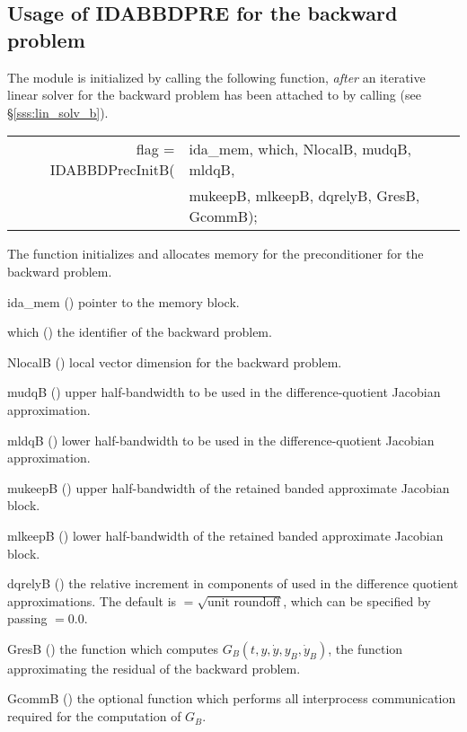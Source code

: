 \subsection{Usage of IDABBDPRE for the backward problem}
The {\idabbdpre} module is initialized by calling the following function,
{\em after} an iterative linear solver for the backward problem has
been attached to {\idas} by calling  (see
\S\ref{sss:lin_solv_b}).
{
  \begin{tabular}[t]{@{}r@{}l@{}}
    flag = IDABBDPrecInitB(&ida\_mem, which, NlocalB, mudqB, mldqB,\\
                           &mukeepB, mlkeepB, dqrelyB, GresB, GcommB);
  \end{tabular}
}
{
  The function  initializes and allocates
  memory for the {\idabbdpre} preconditioner for the backward problem.
}
{
  \begin{args}
  \item[ida\_mem] ()
    pointer to the {\idas} memory block.
  \item[which] ()
    the identifier of the backward problem.
  \item[NlocalB] ()
    local vector dimension for the backward problem.
  \item[mudqB] ()
    upper half-bandwidth to be used in the difference-quotient Jacobian approximation.
  \item[mldqB] ()
    lower half-bandwidth to be used in the difference-quotient Jacobian approximation.
  \item[mukeepB] ()
    upper half-bandwidth of the retained banded approximate Jacobian block.
  \item[mlkeepB] ()
    lower half-bandwidth of the retained banded approximate Jacobian block.
  \item[dqrelyB] ()
    the relative increment in components of  used in the difference quotient
    approximations.  The default is $ = \sqrt{\text{unit roundoff}}$, which
    can be specified by passing $ = 0.0$.
  \item[GresB] ()
    the {\CC} function which computes $G_B(t,y,\dot y, y_B, \dot y_B)$, the
    function approximating the residual of the backward problem.
  \item[GcommB] ()
    the optional {\CC} function which performs all interprocess communication required for
    the computation of $G_B$.
  \end{args}
}
